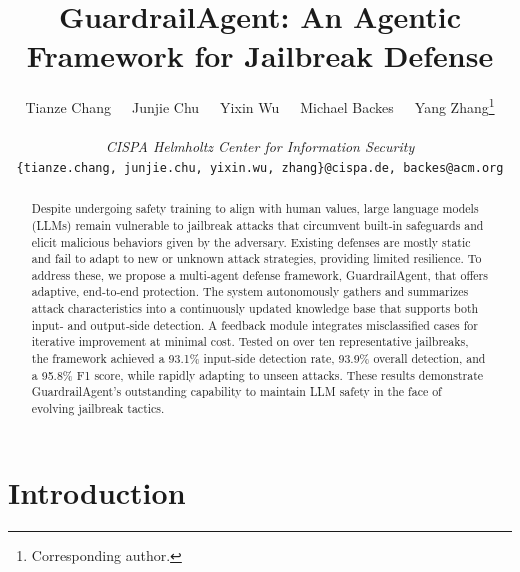 \documentclass[letterpaper,twocolumn,10pt]{article}
\newcommand{\agentname}{GuardrailAgent\xspace}
\begin{document}

\date{}

\title{\bf GuardrailAgent: An Agentic Framework for Jailbreak Defense}

\author{
Tianze Chang\ \ \
Junjie Chu\ \ \
Yixin Wu\ \ \
Michael Backes\ \ \
Yang Zhang\thanks{Corresponding author.}
\\
\\
\textit{CISPA Helmholtz Center for Information Security}
\\
\texttt{\{tianze.chang, junjie.chu, yixin.wu, zhang\}@cispa.de, backes@acm.org}
}

\maketitle

\begin{abstract}

Despite undergoing safety training to align with human values, large language models (LLMs) remain vulnerable to jailbreak attacks that circumvent built‑in safeguards and elicit malicious behaviors given by the adversary.
Existing defenses are mostly static and fail to adapt to new or unknown attack strategies, providing limited resilience.
To address these, we propose a multi‑agent defense framework, \agentname, that offers adaptive, end‑to‑end protection.
The system autonomously gathers and summarizes attack characteristics into a continuously updated knowledge base that supports both input‑ and output‑side detection.
A feedback module integrates misclassified cases for iterative improvement at minimal cost.
Tested on over ten representative jailbreaks, the framework achieved a 93.1\% input‑side detection rate, 93.9\% overall detection, and a 95.8\% F1 score, while rapidly adapting to unseen attacks.
These results demonstrate \agentname's outstanding capability to maintain LLM safety in the face of evolving jailbreak tactics.

\end{abstract}

\section{Introduction}
\end{document}
